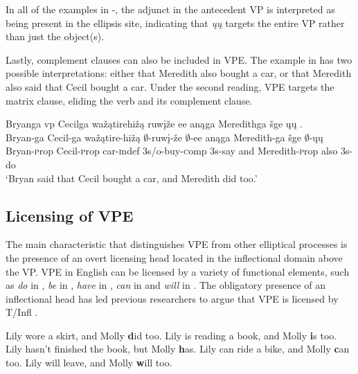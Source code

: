 \documentclass[output=paper]{LSP/langsci}
\begin{document}
In all of the examples in -, the adjunct in the antecedent VP is interpreted as being present in the ellipsis site, indicating that \emph{ųų} targets the entire VP rather than just the object(s).

Lastly, complement clauses can also be included in VPE. The example in  has two possible interpretations: either that Meredith also bought a car, or that Meredith also said that Cecil bought a car. Under the second reading, VPE targets the matrix clause, eliding the verb and its complement clause.
 
\ea\label{ex:johnson:11} 
\glll Bryanga {\ob}{vp} Cecilga wažątirehižą ruwįže ee{\cb} anąga Meredithga šge {\ob}ųų{\cb} .\\
Bryan-ga {} Cecil-ga wažątire-hižą $\emptyset$-ruwį-že $\emptyset$-ee anąga Meredith-ga šge $\emptyset$-ųų\\
Bryan-{\textsc prop} {} Cecil-{\textsc prop} car-{\textsc indef} {\textsc 3s/o}-buy-{\textsc comp} {\textsc 3s}-say and Meredith-{\textsc prop} also {\textsc 3s}-do\\
\trans `Bryan said that Cecil bought a car, and Meredith did too.'
\z


\subsection{Licensing of VPE}\label{sec:johnson:2.2}

The main characteristic that distinguishes VPE from other elliptical processes is the presence of an overt licensing head located in the inflectional domain above the VP. VPE in English can be licensed by a variety of functional elements, such as \emph{do} in , \emph{be} in , \emph{have} in , \emph{can} in  and \emph{will} in . The obligatory presence of an inflectional head has led previous researchers to argue that VPE is licensed by T/Infl \citep{Bresnan1976,Sag1976,Zagona1988,Lobeck1995}.

 
\ea\label{ex:johnson:12}
\ea\label{ex:johnson:12a}
Lily wore a skirt, and Molly {\textbf did} too.
\ex\label{ex:johnson:12b}
Lily is reading a book, and Molly {\textbf is} too.
\ex\label{ex:johnson:12c}
Lily hasn't finished the book, but Molly {\textbf has}.
\ex\label{ex:johnson:12d}
Lily can ride a bike, and Molly {\textbf can} too.
\ex\label{ex:johnson:12e} 
Lily will leave, and Molly {\textbf will} too.
\z
\z
\end{document}
